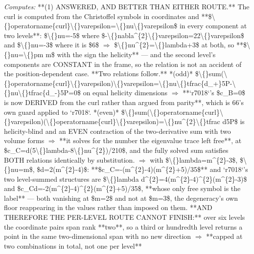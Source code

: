 \begin{description}
\emph{Computes:} **(1) ANSWERED, AND BETTER THAN EITHER ROUTE.** The curl is computed from the Christoffel symbols in coordinates and **\$\textbackslash\{\}operatorname\{curl\}\textbackslash\{\}varepsilon=\textbackslash\{\}nu\textbackslash\{\}varepsilon\$ in every component at two levels**: \$\textbackslash\{\}nu=-5\$ where \$-\textbackslash\{\}nabla\textasciicircum{}\{2\}\textbackslash\{\}varepsilon=22\textbackslash\{\}varepsilon\$ and \$\textbackslash\{\}nu=-3\$ where it is \$6\$ \ensuremath{\Rightarrow} \$\textbackslash\{\}nu\textasciicircum{}\{2\}=\textbackslash\{\}lambda+3\$ at both, so **\$\textbackslash\{\}nu=\textbackslash\{\}pm m\$ with the sign the helicity** --- and the second level's components are CONSTANT in the frame, so the relation is not an accident of the position-dependent case. **Two relations follow.** *(odd)* \$\textbackslash\{\}sum(\textbackslash\{\}operatorname\{curl\}\textbackslash\{\}varepsilon)\textbackslash\{\}varepsilon=\textbackslash\{\}nu\textbackslash\{\}tfrac\{d\_+\}5P-\textbackslash\{\}nu\textbackslash\{\}tfrac\{d\_-\}5P=0\$ on equal helicity dimensions \ensuremath{\Rightarrow}  **`r7018`'s \$c\_B=0\$ is now DERIVED from the curl rather than argued from parity**, which is 66's own guard applied to `r7018`. *(even)* \$\textbackslash\{\}sum(\textbackslash\{\}operatorname\{curl\}\textbackslash\{\}varepsilon)(\textbackslash\{\}operatorname\{curl\}\textbackslash\{\}varepsilon)=\textbackslash\{\}nu\textasciicircum{}\{2\}\textbackslash\{\}tfrac d5P\$ is helicity-blind and an EVEN contraction of the two-derivative sum with two volume forms \ensuremath{\Rightarrow}  **it solves for the number the eigenvalue trace left free**, at \$c\_C=d(5\textbackslash\{\}lambda-8\textbackslash\{\}nu\textasciicircum{}\{2\})/210\$, and the fully solved sum satisfies BOTH relations identically by substitution. \ensuremath{\Rightarrow} with \$\textbackslash\{\}lambda=m\textasciicircum{}\{2\}-3\$, \$\textbackslash\{\}nu=m\$, \$d=2(m\textasciicircum{}\{2\}-4)\$: **\$c\_C=-(m\textasciicircum{}\{2\}-4)(m\textasciicircum{}\{2\}+5)/35\$** and `r7018`'s two level-summed structures are \$\textbackslash\{\}lambda d\textasciicircum{}\{2\}=4(m\textasciicircum{}\{2\}-4)\textasciicircum{}\{2\}(m\textasciicircum{}\{2\}-3)\$ and \$c\_Cd=-2(m\textasciicircum{}\{2\}-4)\textasciicircum{}\{2\}(m\textasciicircum{}\{2\}+5)/35\$, **whose only free symbol is the label** --- both vanishing at \$m=2\$ and not at \$m=3\$, the degeneracy's own floor reappearing in the values rather than imposed on them.  **AND THEREFORE THE PER-LEVEL ROUTE CANNOT FINISH:** over six levels the coordinate pairs span rank **two**, so a third or hundredth level returns a point in the same two-dimensional span with no new direction \ensuremath{\Rightarrow} **capped at two combinations in total, not one per level**

\end{description}
